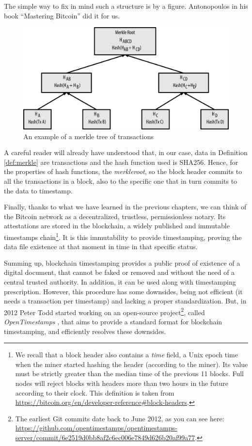 \bigskip
\noindent
The simple way to fix in mind such a structure is by a figure. Antonopoulos in his book \enquote{Mastering Bitcoin} \cite{Antonopoulos:2017:MBP:3164842} did it for us.

\begin{figure}[ht]
    \centering
	\includegraphics[width=0.9\linewidth]{Images/merkle-tree.png}
	\caption{An example of a merkle tree of transactions}
	\label{fig:merkle}
\end{figure}

\bigskip
\noindent
A careful reader will already have understood that, in our case, data in Definition \ref{def:merkle} are transactions and the hash function used  is SHA256. Hence, for the properties of hash functions, the \textit{merkleroot}, so the block header commits to all the transactions in a block, also to the specific one that in turn commits to the data to timestamp. 

\bigskip
\noindent
Finally, thanks to what we have learned in the previous chapters, we can think of the Bitcoin network as a decentralized, trustless, permissionless notary. Its attestations are stored in the blockchain, a widely published and immutable timestamps chain\footnote{We recall that a block header also contains a \textit{time} field, a Unix epoch time when the miner started hashing the header (according to the miner). Its value must be strictly greater than the median time of the previous 11 blocks. Full nodes will reject blocks with headers more than two hours in the future according to their clock. This definition is taken from \url{https://bitcoin.org/en/developer-reference\#block-headers}.}. It is this immutability to provide timestamping, proving the data file existence at that moment in time in that specific status.

\bigskip
\noindent
Summing up, blockchain timestamping provides a public proof of existence of a digital document, that cannot be faked or removed and without the need of a central trusted authority. In addition, it can be used along with timestamping prescription. However, this procedure has some downsides, being not efficient (it needs a transaction per timestamp) and lacking a proper standardization. But, in 2012 Peter Todd started working on an open-source project\footnote{The earliest Git commits date back to June 2012, as you can see here: \url{https://github.com/opentimestamps/opentimestamps-server/commit/6e2519d0bb8af2c6ec006e7849d626b20af99a77}.}, called \textit{OpenTimestamps} \cite{OTSWeb}, that aims to provide a standard format for blockchain timestamping, and efficiently resolves these downsides.

